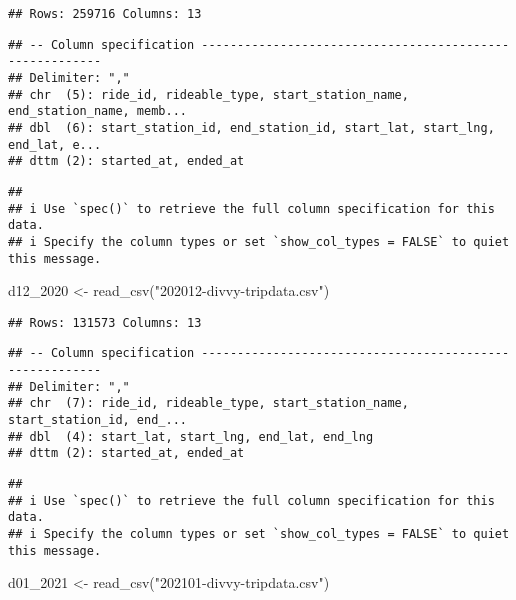 \documentclass[
]{article}
\newenvironment{Shaded}{\begin{snugshade}}{\end{snugshade}}
\newcommand{\FunctionTok}[1]{\textcolor[rgb]{0.00,0.00,0.00}{#1}}
\newcommand{\NormalTok}[1]{#1}
\newcommand{\OtherTok}[1]{\textcolor[rgb]{0.56,0.35,0.01}{#1}}
\newcommand{\StringTok}[1]{\textcolor[rgb]{0.31,0.60,0.02}{#1}}
\begin{document}
\begin{verbatim}
## Rows: 259716 Columns: 13
\end{verbatim}

\begin{verbatim}
## -- Column specification --------------------------------------------------------
## Delimiter: ","
## chr  (5): ride_id, rideable_type, start_station_name, end_station_name, memb...
## dbl  (6): start_station_id, end_station_id, start_lat, start_lng, end_lat, e...
## dttm (2): started_at, ended_at
\end{verbatim}

\begin{verbatim}
## 
## i Use `spec()` to retrieve the full column specification for this data.
## i Specify the column types or set `show_col_types = FALSE` to quiet this message.
\end{verbatim}

\begin{Shaded}
\begin{Highlighting}[]
\NormalTok{d12\_2020 }\OtherTok{\textless{}{-}} \FunctionTok{read\_csv}\NormalTok{(}\StringTok{"202012{-}divvy{-}tripdata.csv"}\NormalTok{)}
\end{Highlighting}
\end{Shaded}

\begin{verbatim}
## Rows: 131573 Columns: 13
\end{verbatim}

\begin{verbatim}
## -- Column specification --------------------------------------------------------
## Delimiter: ","
## chr  (7): ride_id, rideable_type, start_station_name, start_station_id, end_...
## dbl  (4): start_lat, start_lng, end_lat, end_lng
## dttm (2): started_at, ended_at
\end{verbatim}

\begin{verbatim}
## 
## i Use `spec()` to retrieve the full column specification for this data.
## i Specify the column types or set `show_col_types = FALSE` to quiet this message.
\end{verbatim}

\begin{Shaded}
\begin{Highlighting}[]
\NormalTok{d01\_2021 }\OtherTok{\textless{}{-}} \FunctionTok{read\_csv}\NormalTok{(}\StringTok{"202101{-}divvy{-}tripdata.csv"}\NormalTok{)}
\end{Highlighting}
\end{Shaded}
\end{document}
